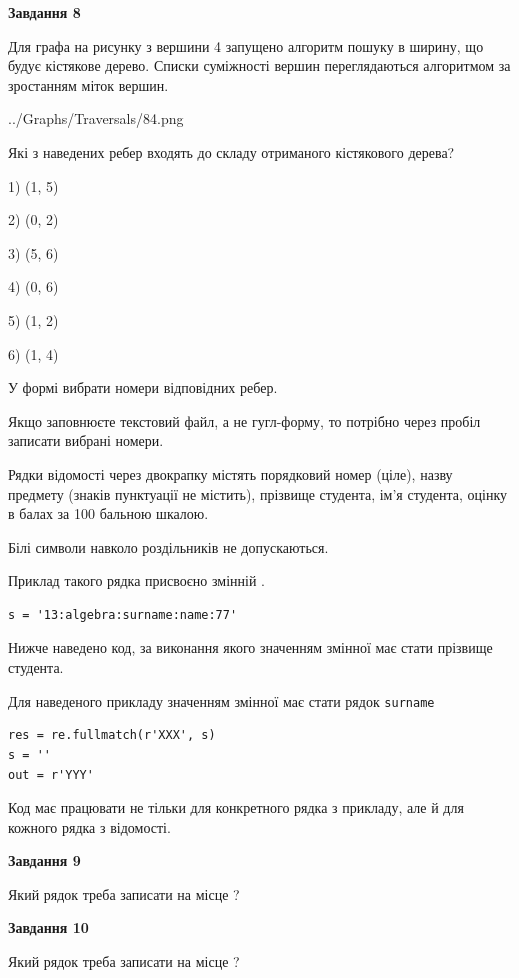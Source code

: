 \documentclass[12pt, ukrainian]{article}
\def\code#1{\Verb!#1!}
\begin{document}
{\begin {large}
{\begin {center}\textbf{Завдання 8}\end {center}}\par
Для графа на рисунку з вершини 4 запущено алгоритм пошуку в ширину, що будує кістякове дерево. Списки суміжності вершин переглядаються алгоритмом за зростанням міток вершин.\par
\begin{center}
	{../Graphs/Traversals/84.png}
\end{center}
\par Які з наведених ребер входять до складу отриманого кістякового дерева?\par
1) (1, 5)\par
2) (0, 2)\par
3) (5, 6)\par
4) (0, 6)\par
5) (1, 2)\par
6) (1, 4)\par
{\vskip 15pt} У формі вибрати номери відповідних ребер.


Якщо заповнюєте текстовий файл, а не гугл-форму, то потрібно через пробіл записа\-ти вибрані номери.\par
\newpage


Рядки відомості через двокрапку містять порядковий номер (ціле), назву предмету (знаків пунктуації не містить), прізвище студента, ім'я студента, оцінку в балах за 100 бальною шкалою.

Білі символи навколо роздільників не допускаються.

Приклад такого рядка присвоєно змінній .



\begin{verbatim}
s = '13:algebra:surname:name:77'
\end{verbatim}


Нижче наведено код, за виконання якого значенням змінної  має стати прізвище студента.

Для наведеного прикладу значенням змінної  має стати рядок \code{surname}



\begin{verbatim}
res = re.fullmatch(r'XXX', s)
s = ''
out = r'YYY'
\end{verbatim}


Код має працювати не тільки для конкретного рядка з прикладу, але й для кожного рядка з відомості.

{\begin {center}\textbf{Завдання 9}\end {center}}\par
Який рядок треба записати на місце  ?\par
\vspace{5mm}


{\begin {center}\textbf{Завдання 10}\end {center}}\par
Який рядок треба записати на місце  ?\par


\newpage


\end {large}}
\end{document}

